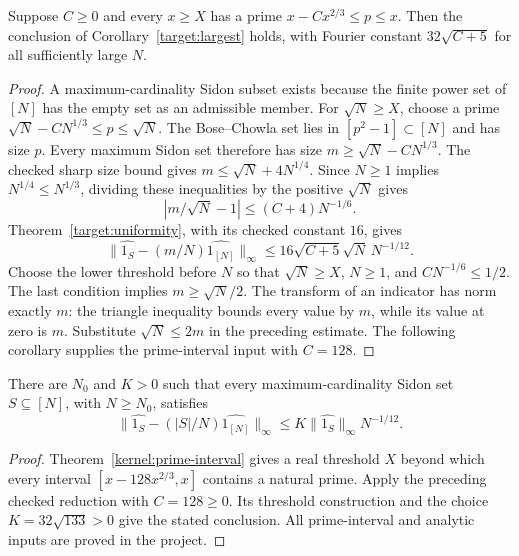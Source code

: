 \begin{lemma}
\label{construction:largest-reduction}
\leanok
Suppose $C\ge0$ and every $x\ge X$ has a prime
$x-Cx^{2/3}\le p\le x$.
Then the conclusion of Corollary~\ref{target:largest} holds, with
Fourier constant $32\sqrt{C+5}$ for all sufficiently large $N$.
\end{lemma}
\begin{proof}
A maximum-cardinality Sidon subset exists because the finite power set
of $[N]$ has the empty set as an admissible member. For
$\sqrt N\ge X$, choose a prime
$\sqrt N-CN^{1/3}\le p\le\sqrt N$.
The Bose--Chowla set lies in $[p^2-1]\subset[N]$ and has size $p$.
Every maximum Sidon set therefore has size
$m\ge\sqrt N-CN^{1/3}$.
The checked sharp size bound gives $m\le\sqrt N+4N^{1/4}$.
Since $N\ge1$ implies $N^{1/4}\le N^{1/3}$, dividing these inequalities
by the positive $\sqrt N$ gives
\[
 |m/\sqrt N-1|\le(C+4)N^{-1/6}.
\]
Theorem~\ref{target:uniformity}, with its checked constant $16$, gives
\[
 \|\widehat{1_S}-(m/N)\widehat{1_{[N]}}\|_\infty
 \le16\sqrt{C+5}\sqrt N\,N^{-1/12}.
\]
Choose the lower threshold before $N$ so that $\sqrt N\ge X$,
$N\ge1$, and $CN^{-1/6}\le1/2$. The last condition implies
$m\ge\sqrt N/2$. The transform of an indicator has norm exactly $m$:
the triangle inequality bounds every value by $m$, while its value at
zero is $m$. Substitute $\sqrt N\le2m$ in the preceding estimate.
The following corollary supplies the prime-interval input with $C=128$.
\end{proof}

\begin{corollary}
\label{construction:largest-unconditional}
\leanok
There are $N_0$ and $K>0$ such that every maximum-cardinality Sidon
set $S\subseteq[N]$, with $N\geq N_0$, satisfies
\[
 \|\widehat{1_S}-(|S|/N)\widehat{1_{[N]}}\|_\infty
 \leq K\|\widehat{1_S}\|_\infty N^{-1/12}.
\]
\end{corollary}
\begin{proof}
Theorem~\ref{kernel:prime-interval} gives a real threshold $X$ beyond
which every interval $[x-128x^{2/3},x]$ contains a natural prime.
Apply the preceding checked reduction with $C=128\geq0$.
Its threshold construction and the choice $K=32\sqrt{133}>0$ give
the stated conclusion.  All prime-interval and analytic inputs are
proved in the project.
\end{proof}

